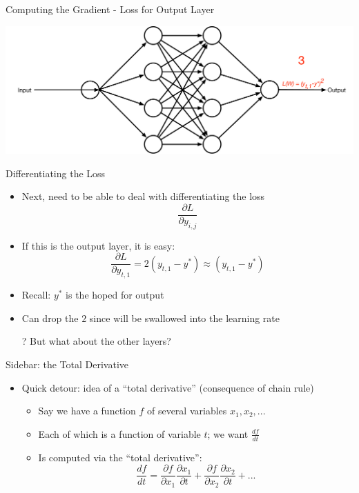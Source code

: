 \documentclass[aspectratio=169]{beamer}
\begin{document}
\begin{frame}{Computing the Gradient - Loss for Output Layer}

\includegraphics[width=1\textwidth]{lectBP/nnbpStep3.pdf}
\end{frame}
\begin{frame}{Differentiating the Loss}

\begin{itemize}
	\item Next, need to be able to deal with differentiating the loss
		$$\frac{\partial L}{\partial y_{i,j}}$$
	\item If this is the output layer, it is easy:
	$$\frac{\partial L}{\partial y_{t,1}} = 2 (y_{t,1} - y^{*}) \approx (y_{t,1} - y^{*})$$
	\item Recall: $y^*$ is the hoped for output
	\item Can drop the $2$ since will be swallowed into the learning rate
	\item[?] But what about the other layers?
\end{itemize}
\end{frame}
\begin{frame}{Sidebar: the Total Derivative}

\begin{itemize}
	\item Quick detour: idea of a ``total derivative'' (consequence of chain rule)
	\begin{itemize}
		\item Say we have a function $f$ of several variables $x_1, x_2, ...$
		\item Each of which is a function of variable $t$; we want $\frac{df}{dt}$
		\item Is computed via the ``total derivative'':
		$$\frac{df}{dt} = \frac{\partial f}{\partial x_1} \frac{\partial x_1}{\partial t} + 
			 \frac{\partial f}{\partial x_2} \frac{\partial x_2}{\partial t} + ...$$
	\end{itemize}
\end{itemize}
\end{frame}
\end{document}
